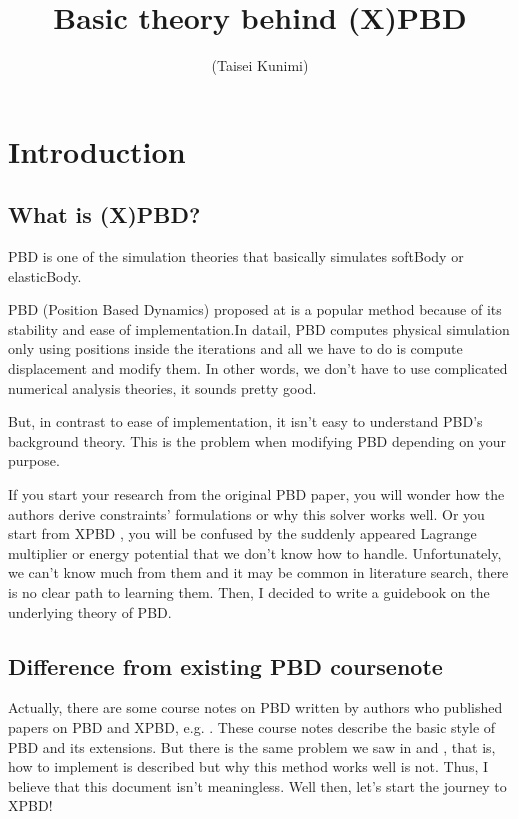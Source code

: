 \documentclass[pdflatex,sn-mathphys-num]{sn-jnl}%
\theoremstyle{thmstyleone}%
\theoremstyle{thmstyletwo}%
\theoremstyle{thmstylethree}%
\begin{document}
	\title[Basic theory behind (X)PBD]{Basic theory behind (X)PBD}
	\author*{ (Taisei Kunimi)}
\maketitle
\tableofcontents
\newpage

\section{Introduction}\label{sec1}
\subsection{What is (X)PBD?}
PBD is one of the simulation theories that basically simulates \gls{softBody} or \gls{elasticBody}.

PBD (Position Based Dynamics) proposed at \cite{PBD} is a popular method because of its stability and ease of implementation.In datail, PBD computes physical simulation only using positions inside the \gls{iteration}s and all we have to do is compute displacement and modify them.
In other words, we don't have to use complicated numerical analysis theories, it sounds pretty good.

But, in contrast to ease of implementation, it isn't easy to understand PBD's background theory. This is the problem when modifying PBD depending on your purpose. 

If you start your research from the original PBD paper\cite{PBD}, you will wonder how the authors derive constraints' formulations or why this solver works well. Or you start from XPBD \cite{XPBD}, you will be confused by the suddenly appeared Lagrange multiplier or energy potential that we don't know how to handle.
Unfortunately, we can't know much from them and it may be common in literature search, there is no clear path to learning them. Then, I decided to write a guidebook on the underlying theory of PBD.

\subsection{Difference from existing PBD coursenote}
Actually, there are some course notes on PBD written by authors who published papers on PBD and XPBD, e.g. \cite{PBDCoursenote}. These course notes describe the basic style of PBD and its extensions. But there is the same problem we saw in \cite{PBD} and \cite{XPBD}, that is, how to implement is described but why this method works well is not. Thus, I believe that this document isn't meaningless. Well then, let's start the journey to XPBD!
\end{document}
